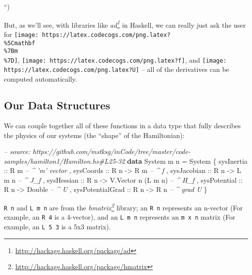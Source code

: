 \documentclass[]{article}
\newenvironment{Shaded}{}{}
\newcommand{\KeywordTok}[1]{\textcolor[rgb]{0.00,0.44,0.13}{\textbf{#1}}}
\newcommand{\DataTypeTok}[1]{\textcolor[rgb]{0.56,0.13,0.00}{#1}}
\newcommand{\CommentTok}[1]{\textcolor[rgb]{0.38,0.63,0.69}{\textit{#1}}}
\newcommand{\OtherTok}[1]{\textcolor[rgb]{0.00,0.44,0.13}{#1}}
\newcommand{\FunctionTok}[1]{\textcolor[rgb]{0.02,0.16,0.49}{#1}}
\newcommand{\NormalTok}[1]{#1}
\renewcommand{\href}[2]{#2\footnote{\url{#1}}}
\begin{document}
``)

But, as we'll see, with libraries like
\emph{\href{http://hackage.haskell.org/package/ad}{ad}} in Haskell, we can
really just ask the user for
\texttt{[image: https://latex.codecogs.com/png.latex?\\\%5Cmathbf\\\%7Bm\\\%7D]},
\texttt{[image: https://latex.codecogs.com/png.latex?f]}, and
\texttt{[image: https://latex.codecogs.com/png.latex?U]} -- all of the
derivatives can be computed automatically.

\subsection{Our Data Structures}\label{our-data-structures}

We can couple together all of these functions in a data type that fully
describes the physics of our systems (the ``shape'' of the Hamiltonian):

\begin{Shaded}
\begin{Highlighting}[]
\CommentTok{-- source: https://github.com/mstksg/inCode/tree/master/code-samples/hamilton1/Hamilton.hs#L25-32}
\KeywordTok{data} \DataTypeTok{System}\NormalTok{ m n }\FunctionTok{=} \DataTypeTok{System}
\NormalTok{    \{}\OtherTok{ sysInertia       ::} \DataTypeTok{R}\NormalTok{ m                         }\CommentTok{-- ^ 'm' vector}
\NormalTok{    ,}\OtherTok{ sysCoords        ::} \DataTypeTok{R}\NormalTok{ n }\OtherTok{->} \DataTypeTok{R}\NormalTok{ m                  }\CommentTok{-- ^ f}
\NormalTok{    ,}\OtherTok{ sysJacobian      ::} \DataTypeTok{R}\NormalTok{ n }\OtherTok{->} \DataTypeTok{L}\NormalTok{ m n                }\CommentTok{-- ^ J_f}
\NormalTok{    ,}\OtherTok{ sysHessian       ::} \DataTypeTok{R}\NormalTok{ n }\OtherTok{->} \DataTypeTok{V.Vector}\NormalTok{ n (}\DataTypeTok{L}\NormalTok{ m n)   }\CommentTok{-- ^ H_f}
\NormalTok{    ,}\OtherTok{ sysPotential     ::} \DataTypeTok{R}\NormalTok{ n }\OtherTok{->} \DataTypeTok{Double}               \CommentTok{-- ^ U}
\NormalTok{    ,}\OtherTok{ sysPotentialGrad ::} \DataTypeTok{R}\NormalTok{ n }\OtherTok{->} \DataTypeTok{R}\NormalTok{ n                  }\CommentTok{-- ^ grad U}
\NormalTok{    \}}
\end{Highlighting}
\end{Shaded}

\texttt{R\ n} and \texttt{L\ m\ n} are from the
\emph{\href{http://hackage.haskell.org/package/hmatrix}{hmatrix}} library; an
\texttt{R\ n} represents an n-vector (For example, an \texttt{R\ 4} is a
4-vector), and an \texttt{L\ m\ n} represents an \texttt{m\ x\ n} matrix (For
example, an \texttt{L\ 5\ 3} is a 5x3 matrix).
\end{document}
